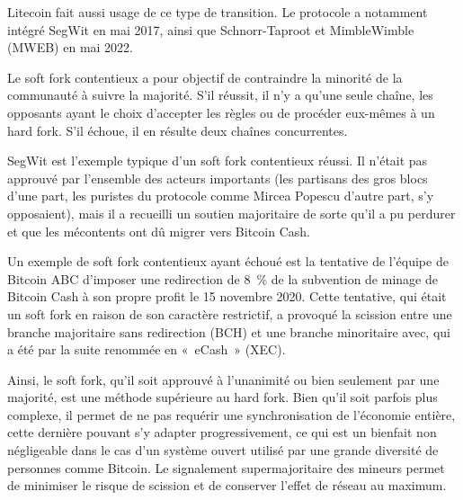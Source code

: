 Litecoin fait aussi usage de ce type de transition. Le protocole a notamment intégré SegWit en mai 2017, ainsi que Schnorr-Taproot et MimbleWimble (MWEB) en mai 2022.

Le soft fork contentieux a pour objectif de contraindre la minorité de la communauté à suivre la majorité. S'il réussit, il n'y a qu'une seule chaîne, les opposants ayant le choix d'accepter les règles ou de procéder eux-mêmes à un hard fork. S'il échoue, il en résulte deux chaînes concurrentes.

SegWit est l'exemple typique d'un soft fork contentieux réussi. Il n'était pas approuvé par l'ensemble des acteurs importants (les partisans des gros blocs d'une part, les puristes du protocole comme Mircea Popescu d'autre part, s'y opposaient), mais il a recueilli un soutien majoritaire de sorte qu'il a pu perdurer et que les  mécontents ont dû migrer vers Bitcoin Cash.

Un exemple de soft fork contentieux ayant échoué est la tentative de l'équipe de Bitcoin ABC d'imposer une redirection de 8~\% de la subvention de minage de Bitcoin Cash à son propre profit le 15 novembre 2020. Cette tentative, qui était un soft fork en raison de son caractère restrictif, a provoqué la scission entre une branche majoritaire sans redirection (BCH) et une branche minoritaire avec, qui a été par la suite renommée en «~eCash~» (XEC).

Ainsi, le soft fork, qu'il soit approuvé à l'unanimité ou bien seulement par une majorité, est une méthode supérieure au hard fork. Bien qu'il soit parfois plus complexe, il permet de ne pas requérir une synchronisation de l'économie entière, cette dernière pouvant s'y adapter progressivement, ce qui est un bienfait non négligeable dans le cas d'un système ouvert utilisé par une grande diversité de personnes comme Bitcoin. Le signalement supermajoritaire des mineurs permet de minimiser le risque de scission et de conserver l'effet de réseau au maximum.


